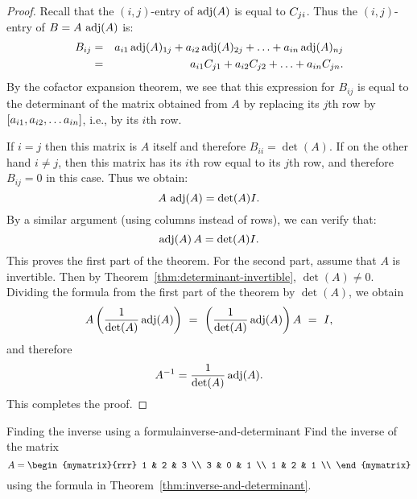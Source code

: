 \begin{proof}
  Recall that the $(i,j)$-entry of $\adj(A)$ is equal to
  $\cofactor{A}{ji}$.  Thus the $(i,j)$-entry of $B=A\,\adj(A)$ is:
  \begin{eqnarray*}
    B_{ij}
    &=& a_{i1}\adj(A)_{1j} + a_{i2}\adj(A)_{2j} + \ldots + a_{in}\adj(A)_{nj} \\
    &=& a_{i1}\cofactor{A}{j1} + a_{i2}\cofactor{A}{j2} + \ldots + a_{in}\cofactor{A}{jn}.
  \end{eqnarray*}
  By the cofactor expansion theorem, we see that this expression for
  $B_{ij}$ is equal to the determinant of the matrix obtained from $A$
  by replacing its $j$th row by $\mat{a_{i1}, a_{i2}, \dots a_{in}}$,
  i.e., by its $i$th row.

  If $i=j$ then this matrix is $A$ itself and therefore
  $B_{ii}=\det(A)$. If on the other hand $i\neq j$, then this matrix
  has its $i$th row equal to its $j$th row, and therefore $B_{ij}=0$
  in this case. Thus we obtain:
  \begin{equation*}
    A \, \adj(A) = {\det(A)} I.
  \end{equation*}
  By a similar argument (using columns instead of rows), we can verify that:
  \begin{equation*}
    \adj(A)\,A = {\det(A)} I.
  \end{equation*}
  This proves the first part of the theorem. For the second part,
  assume that $A$ is invertible. Then by
  Theorem~\ref{thm:determinant-invertible}, $\det(A)\neq 0$. Dividing the
  formula from the first part of the theorem by $\det(A)$, we obtain
  \begin{equation*}
    A\paren{\frac{1}{\det(A)}\adj(A)} ~=~ \paren{\frac{1}{\det(A)}\adj(A)}A ~=~ I,
  \end{equation*}
  and therefore
  \begin{equation*}
    A^{-1} = \frac{1}{\det(A)} \adj(A).
  \end{equation*}
  This completes the proof.
\end{proof}

\begin{example}{Finding the inverse using a formula}{inverse-and-determinant}
  Find the inverse of the matrix
  \begin{equation*}
    A=\begin{mymatrix}{rrr}
      1 & 2 & 3 \\
      3 & 0 & 1 \\
      1 & 2 & 1 \\
    \end{mymatrix}
  \end{equation*}
  using the formula in Theorem~\ref{thm:inverse-and-determinant}.
\end{example}


